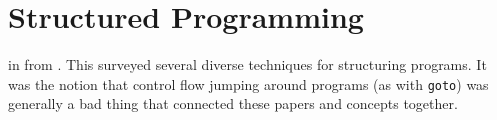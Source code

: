 \section{Structured Programming}

 in \citeyear{structured_programming_1972}
from \citeauthor{structured_programming_1972}.
This surveyed several diverse techniques for structuring programs.
It was the notion that control flow jumping around programs (as with \texttt{goto})
was generally a bad thing that connected these papers and concepts together.

